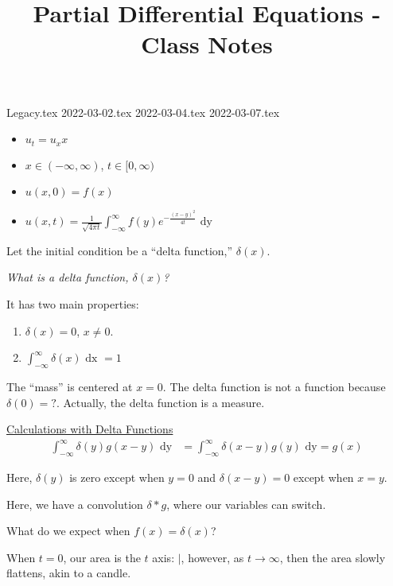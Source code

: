 \documentclass{article}
\title{Partial Differential Equations - Class Notes} %
\begin{document}
\maketitle
\newpage

{Legacy.tex}
{2022-03-02.tex}
{2022-03-04.tex}
{2022-03-07.tex}


%
\begin{itemize}
  \item $u_t = u_xx$
  \item $x \in (-\infty, \infty)$, $t \in [0, \infty)$
  \item $u(x, 0) = f(x)$
  \item $\displaystyle u(x, t) = \frac{1}{\sqrt{4 \pi t}} \int^\infty_{-\infty} f(y) e^{- \frac{(x - y)^2}{4t}} \text{ dy}$
\end{itemize}

Let the initial condition be a ``delta function,'' $\delta(x)$.

\bigbreak

\emph{What is a delta function, $\delta(x)$?}

It has two main properties:
%
\begin{enumerate}
  \item $\delta(x) = 0$, $x \neq 0$.
  \item $\displaystyle \int^\infty_{-\infty} \delta(x) \text{ dx } = 1$
\end{enumerate}

The ``mass'' is centered at $x = 0$. The delta function is not a function because $\delta(0) = ?$. Actually, the delta function is a measure.

\underline{Calculations with Delta Functions}
%
\begin{align}
  \int^\infty_{-\infty} \delta(y) g(x - y) \text{ dy}
  & = \int^\infty_{-\infty} \delta(x- y) g(y) \text{ dy} = g(x)
\end{align}

Here, $\delta(y)$ is zero except when $y = 0$ and $\delta(x - y) = 0$ except when $x = y$.

Here, we have a convolution $\delta * g$, where our variables can switch.

What do we expect when $f(x) = \delta(x)$?

When $t = 0$, our area is the $t$ axis: $|$, however, as $t \to \infty$, then the area slowly flattens, akin to a candle.
\end{document}
